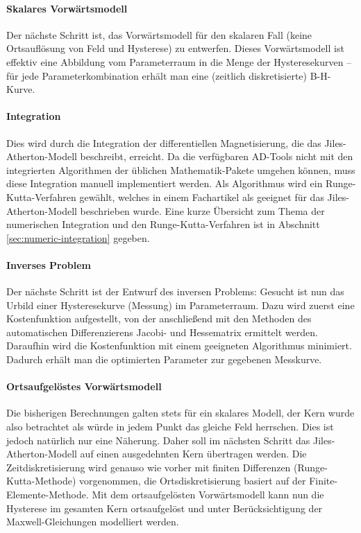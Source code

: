 \documentclass{scrartcl}
\begin{document}
\paragraph{Skalares Vorwärtsmodell} Der nächste Schritt ist, das Vorwärtsmodell für den skalaren Fall (keine Ortsauflösung von Feld und Hysterese) zu entwerfen. Dieses Vorwärtsmodell ist effektiv eine Abbildung vom Parameterraum in die Menge der Hysteresekurven -- für jede Parameterkombination erhält man eine (zeitlich diskretisierte) B-H-Kurve.
\paragraph{Integration} Dies wird durch die Integration der differentiellen Magnetisierung, die das Jiles-Atherton-Modell beschreibt, erreicht. Da die verfügbaren AD-Tools nicht mit den  integrierten Algorithmen der üblichen Mathematik-Pakete umgehen können, muss diese Integration manuell implementiert werden. Als Algorithmus wird ein Runge-Kutta-Verfahren gewählt, welches in einem Fachartikel als geeignet für das Jiles-Atherton-Modell beschrieben wurde. Eine kurze Übersicht zum Thema der numerischen Integration und den Runge-Kutta-Verfahren ist in Abschnitt \ref{sec:numeric-integration} gegeben.
\paragraph{Inverses Problem} Der nächste Schritt ist der Entwurf des inversen Problems: Gesucht ist nun das Urbild einer Hysteresekurve (Messung) im Parameterraum. Dazu wird zuerst eine Kostenfunktion aufgestellt, von der anschließend mit den Methoden des automatischen Differenzierens Jacobi- und Hessematrix ermittelt werden. Daraufhin wird die Kostenfunktion mit einem geeigneten Algorithmus minimiert. Dadurch erhält man die optimierten Parameter zur gegebenen Messkurve.\\
\paragraph{Ortsaufgelöstes Vorwärtsmodell}
Die bisherigen Berechnungen galten stets für ein skalares Modell, der Kern wurde also betrachtet als würde in jedem Punkt das gleiche Feld herrschen. Dies ist jedoch natürlich nur eine Näherung. Daher soll im nächsten Schritt das Jiles-Atherton-Modell auf einen ausgedehnten Kern übertragen werden. Die Zeitdiskretisierung wird genauso wie vorher mit finiten Differenzen (Runge-Kutta-Methode) vorgenommen, die Ortsdiskretisierung basiert auf der Finite-Elemente-Methode. Mit dem ortsaufgelösten Vorwärtsmodell kann nun die Hysterese im gesamten Kern ortsaufgelöst und unter Berücksichtigung der Maxwell-Gleichungen modelliert werden.
\end{document}

